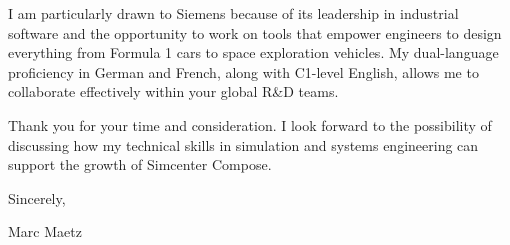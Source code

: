 \documentclass[11pt,a4paper]{article}
\begin{document}
I am particularly drawn to Siemens because of its leadership in industrial software and the opportunity to work on tools that empower engineers to design everything from Formula 1 cars to space exploration vehicles. My dual-language proficiency in German and French, along with C1-level English, allows me to collaborate effectively within your global R\&D teams.

Thank you for your time and consideration. I look forward to the possibility of discussing how my technical skills in simulation and systems engineering can support the growth of Simcenter Compose.

\vspace{12pt}

Sincerely,

\vspace{18pt}

Marc Maetz
\end{document}
